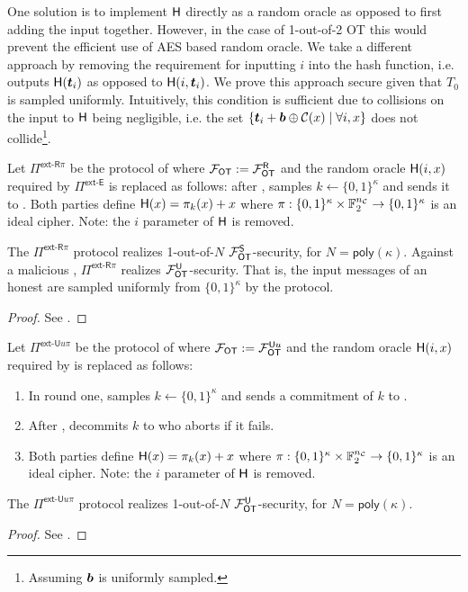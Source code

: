 One solution is to implement $\mathsf{H}$ directly as a random oracle as opposed to first adding the input together. However, in the case of 1-out-of-2 OT this would prevent the efficient use of AES based random oracle. We take a different approach by removing the requirement for inputting $i$ into the hash function, i.e. \rec outputs $\mathsf{H}(\boldsymbol{t}_i)$ as opposed to $\mathsf{H}(i,\boldsymbol{t}_i)$. We prove this approach secure given that $T_0$ is sampled uniformly. Intuitively, this condition is sufficient due to collisions on the input to $\mathsf{H}$ being negligible, i.e. the set $\{\boldsymbol{t}_i + \boldsymbol{b}\oplus\mathcal{C}(x) \mid \forall i,x\}$ does not collide\footnote{Assuming $\boldsymbol{b}$ is uniformly sampled.}.

\begin{definition}\label{def:ext_R_S}
	Let $\Pi^{\textsf{ext-R}\pi}$ be the protocol of  where $\mathcal{F}_{\mathsf{OT}}:=\mathcal{F}_{\mathsf{OT}}^\mathsf{R}$ and the random oracle $\mathsf{H}(i,x)$ required by $\Pi^{\textsf{ext-E}}$ is replaced as follows: after , \send samples $k\gets\{0,1\}^{\kappa}$ and sends it to \rec. Both parties define $\mathsf{H}(x)=\pi_k(x)+x$ where $\pi:\{0,1\}^{\kappa} \times \mathbb{F}^{{n_\mathcal{C}}}_2 \rightarrow\{0,1\}^\kappa$ is an ideal cipher. Note: the $i$ parameter of $\mathsf{H}$ is removed.
\end{definition}
\begin{lemma}\label{lem:ext_R_S}
	The $\Pi^{\textsf{ext-R}\pi}$ protocol realizes 1-out-of-$N$ $\mathcal{F}_{\mathsf{OT}}^\mathsf{S}$-security, for $N=\textsf{poly}(\kappa)$. Against a malicious \rec,  $\Pi^{\textsf{ext-R}\pi}$ realizes $\mathcal{F}_{\mathsf{OT}}^\mathsf{U}$-security. That is, the input messages of an honest \send are sampled uniformly from $\{0,1\}^\kappa$ by the protocol.
\end{lemma}
\iffullversion

\else
\begin{proof}
	See .
	\pe
\end{proof}
\fi

\begin{definition}\label{def:ext_U_U}
	Let $\Pi^{\textsf{ext-U}u\pi}$ be the protocol of  where $\mathcal{F}_{\mathsf{OT}}:=\mathcal{F}_{\mathsf{OT}}^{\mathsf{U} u}$ and the random oracle $\mathsf{H}(i,x)$ required by  is replaced as follows:
	\begin{enumerate}
		\item In round one, \send samples $k\gets\{0,1\}^{\kappa}$ and sends a commitment of $k$ to \rec.
		\item After , \send decommits $k$ to \rec who aborts if it fails.
		\item Both parties define $\mathsf{H}(x)=\pi_k(x)+x$ where $\pi:\{0,1\}^{\kappa} \times \mathbb{F}^{{n_\mathcal{C}}}_2 \rightarrow\{0,1\}^\kappa$ is an ideal cipher. Note: the $i$ parameter of $\mathsf{H}$ is removed.
	\end{enumerate}
\end{definition}

\begin{lemma}\label{lem:ext_U_U}
	The $\Pi^{\textsf{ext-U}u\pi}$ protocol realizes 1-out-of-$N$ $\mathcal{F}_{\mathsf{OT}}^\mathsf{U}$-security, for $N=\textsf{poly}(\kappa)$.
\end{lemma}
\iffullversion

\else
\begin{proof}
See .
\pe
\end{proof}
\fi

